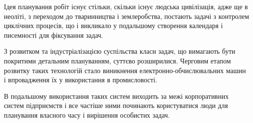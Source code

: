 Ідея планування робіт існує стільки, скільки існує людська цивілізація, адже ще в неоліті, з переходом до тваринництва і землеробства, постають задачі з контролем циклічних процесів, що і викликало у подальшому створення календаря і писемності для фіксування задач.

З розвитком та індустріалізацією суспільства класи задач, що вимагають бути покритими детальним плануванням, суттєво розширилися. Черговим етапом розвитку таких технологій стало виникнення електронно-обчислювальних машин і впровадження їх у використання в промисловості.

В подальшому використання таких систем виходить за межі корпоративних систем підприємств і все частіше ними починають користуватися люди для планування власного часу і вирішення особистих задач.

